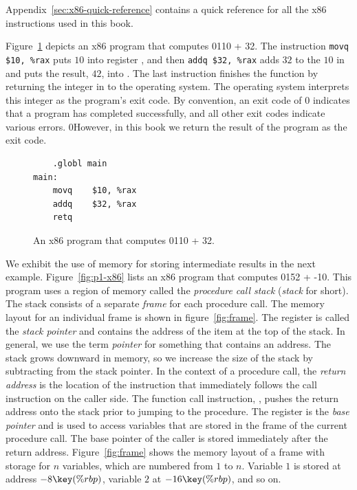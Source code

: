 \documentclass[7x10]{TimesAPriori_MIT}%
\def\racketEd{0}
\def\pythonEd{1}
\def\edition{0}
\newcommand{\racket}[1]{{\if\edition\racketEd{#1}\fi}}
\newcommand{\python}[1]{{\if\edition\pythonEd #1\fi}}
\numberwithin{theorem}{chapter}
\numberwithin{definition}{chapter}
\numberwithin{equation}{chapter}
\begin{document}
Appendix~\ref{sec:x86-quick-reference} contains a quick reference for
all the x86 instructions used in this book.

Figure~\ref{fig:p0-x86} depicts an x86 program that computes
\racket{}\python{10 + 32}. The instruction
\lstinline{movq $10, %rax}
puts $10$ into register , and then \lstinline{addq $32, %rax}
adds $32$ to the $10$ in  and
puts the result, $42$, into .
%
The last instruction  finishes the  function by
returning the integer in  to the operating system. The
operating system interprets this integer as the program's exit
code. By convention, an exit code of 0 indicates that a program has
completed successfully, and all other exit codes indicate various
errors.
%
\racket{However, in this book we return the result of the program
  as the exit code.}

\begin{figure}[tbp]
\begin{minipage}{0.45\textwidth}
\begin{tcolorbox}[colback=white]
\begin{lstlisting}
	.globl main
main:
	movq	$10, %rax
	addq	$32, %rax
	retq
\end{lstlisting}
\end{tcolorbox}
\end{minipage}

\caption{An x86 program that computes
  \racket{}\python{10 + 32}.}
\label{fig:p0-x86}
\end{figure}

We exhibit the use of memory for storing intermediate results in the
next example.  Figure~\ref{fig:p1-x86} lists an x86 program that
computes \racket{}\python{52 + -10}. This program
uses a region of memory called the \emph{procedure call stack}
(\emph{stack} for
short). 
The stack consists of a separate \emph{frame}
for each procedure call. The memory layout for an individual frame is
shown in figure~\ref{fig:frame}.  The register  is called the
\emph{stack pointer} and contains the
address of the item at the top of the stack.  In general, we use the
term \emph{pointer} for something that
contains an address. The stack grows downward in memory, so we
increase the size of the stack by subtracting from the stack pointer.
In the context of a procedure call, the \emph{return
  address} is the location of the
instruction that immediately follows the call instruction on the
caller side.  The function call instruction, , pushes the
return address onto the stack prior to jumping to the procedure.  The
register  is the \emph{base pointer} and is used to access variables that are stored in the
frame of the current procedure call.  The base pointer of the caller
is stored immediately after the return address.
Figure~\ref{fig:frame} shows the memory layout of a frame with storage
for $n$ variables, which are numbered from $1$ to $n$. Variable $1$ is
stored at address $-8\key{(\%rbp)}$, variable $2$ at
$-16\key{(\%rbp)}$, and so on.
\end{document}
